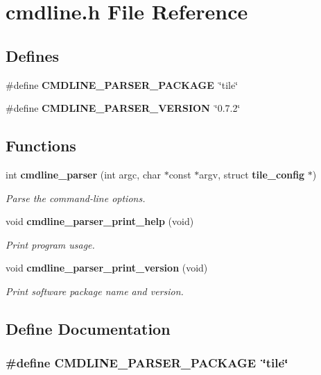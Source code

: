 \section{cmdline.h File Reference}
\label{cmdline_8h}
\subsection*{Defines}
\begin{CompactItemize}
\item 
\#define {\bf CMDLINE\_\-PARSER\_\-PACKAGE}~\char`\"{}tile\char`\"{}
\item 
\#define {\bf CMDLINE\_\-PARSER\_\-VERSION}~\char`\"{}0.7.2\char`\"{}
\end{CompactItemize}
\subsection*{Functions}
\begin{CompactItemize}
\item 
int {\bf cmdline\_\-parser} (int argc, char $\ast$const $\ast$argv, struct {\bf tile\_\-config} $\ast$)
\begin{CompactList}\small\item\em Parse the command-line options. \item\end{CompactList}\item 
void {\bf cmdline\_\-parser\_\-print\_\-help} (void)
\begin{CompactList}\small\item\em Print program usage. \item\end{CompactList}\item 
void {\bf cmdline\_\-parser\_\-print\_\-version} (void)
\begin{CompactList}\small\item\em Print software package name and version. \item\end{CompactList}\end{CompactItemize}


\subsection{Define Documentation}
\subsubsection{\setlength{\rightskip}{0pt plus 5cm}\#define CMDLINE\_\-PARSER\_\-PACKAGE~\char`\"{}tile\char`\"{}}\label{cmdline_8h_a0}


